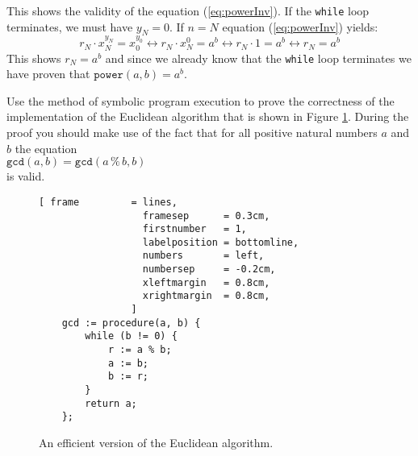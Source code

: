 This shows the validity of the equation (\ref{eq:powerInv}).   If the \texttt{while} loop
terminates, we must have $y_N = 0$.  If $n=N$ equation (\ref{eq:powerInv}) yields:
\[ r_N \cdot x_N^{y_N} = x_0^{y_0} 
  \leftrightarrow  r_N \cdot x_N^{0}   = a^b
  \leftrightarrow  r_N \cdot 1         = a^b
  \leftrightarrow  r_N                 = a^b
\]
This shows $r_N = a^b$ and since we already know that the
\texttt{while} loop terminates we have proven that
$\texttt{power}(a,b) =a^b$.

\exercise
Use the method of symbolic program execution to prove the correctness of the implementation of the
Euclidean algorithm that is shown in Figure \ref{fig:gcd.stlx}.  During the proof you should make
use of the fact that for all positive natural numbers $a$ and $b$ the equation
\\[0.2cm]
\hspace*{1.3cm}
$\mathtt{gcd}(a, b) = \mathtt{gcd}(a \,\texttt{\%}\, b, b)$
\\[0.2cm]
is valid.  

\begin{figure}[!ht]
\centering
\begin{Verbatim}[ frame         = lines, 
                  framesep      = 0.3cm, 
                  firstnumber   = 1,
                  labelposition = bottomline,
                  numbers       = left,
                  numbersep     = -0.2cm,
                  xleftmargin   = 0.8cm,
                  xrightmargin  = 0.8cm,
                ]
    gcd := procedure(a, b) {
        while (b != 0) {
            r := a % b;
            a := b;
            b := r;
        }
        return a;
    };
\end{Verbatim}
\vspace*{-0.3cm}
\caption{An efficient version of the Euclidean algorithm.}
\label{fig:gcd.stlx}
\end{figure}


